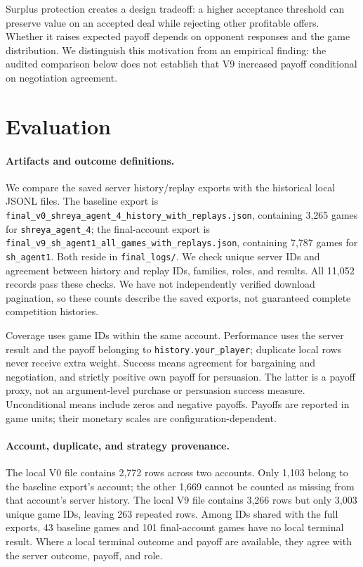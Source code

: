 \documentclass{article}
\begin{document}
Surplus protection creates a design tradeoff: a higher acceptance threshold can preserve value on an accepted deal while rejecting other profitable offers. Whether it raises expected payoff depends on opponent responses and the game distribution. We distinguish this motivation from an empirical finding: the audited comparison below does not establish that V9 increased payoff conditional on negotiation agreement.

\section{Evaluation}

\paragraph{Artifacts and outcome definitions.}
We compare the saved server history/replay exports with the historical local JSONL files. The baseline export is \texttt{final\_v0\_shreya\_agent\_4\_history\_with\_replays.json}, containing 3,265 games for \texttt{shreya\_agent\_4}; the final-account export is \texttt{final\_v9\_sh\_agent1\_all\_games\_with\_replays.json}, containing 7,787 games for \texttt{sh\_agent1}. Both reside in \texttt{final\_logs/}. We check unique server IDs and agreement between history and replay IDs, families, roles, and results. All 11,052 records pass these checks. We have not independently verified download pagination, so these counts describe the saved exports, not guaranteed complete competition histories.

Coverage uses game IDs within the same account. Performance uses the server result and the payoff belonging to \texttt{history.your\_player}; duplicate local rows never receive extra weight. Success means agreement for bargaining and negotiation, and strictly positive own payoff for persuasion. The latter is a payoff proxy, not an argument-level purchase or persuasion success measure. Unconditional means include zeros and negative payoffs. Payoffs are reported in game units; their monetary scales are configuration-dependent.

\paragraph{Account, duplicate, and strategy provenance.}
The local V0 file contains 2,772 rows across two accounts. Only 1,103 belong to the baseline export's account; the other 1,669 cannot be counted as missing from that account's server history. The local V9 file contains 3,266 rows but only 3,003 unique game IDs, leaving 263 repeated rows. Among IDs shared with the full exports, 43 baseline games and 101 final-account games have no local terminal result. Where a local terminal outcome and payoff are available, they agree with the server outcome, payoff, and role.
\end{document}
